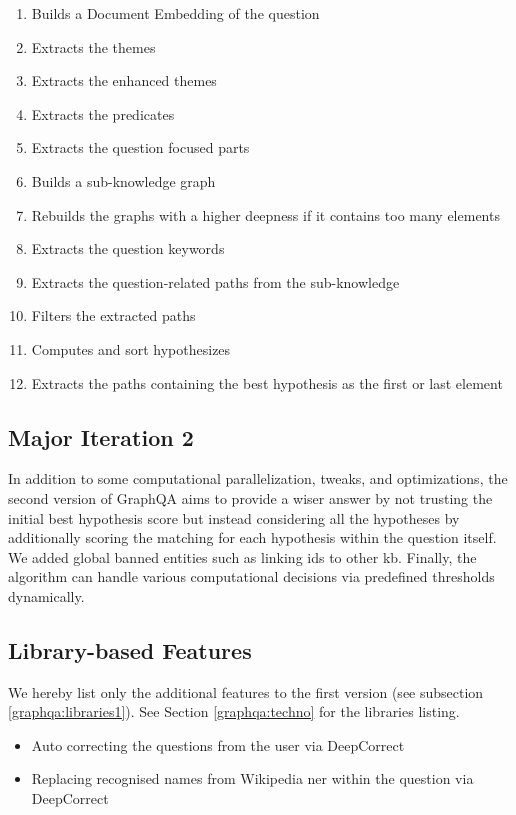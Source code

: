 \begin{enumerate}
    \setlength\itemsep{0em}
    \item Builds a Document Embedding of the question
    \item Extracts the themes
    \item Extracts the enhanced themes
    \item Extracts the predicates
    \item Extracts the question focused parts
    \item Builds a sub-knowledge graph
    \item Rebuilds the graphs with a higher deepness if it contains too many elements
    \item Extracts the question keywords
    \item Extracts the question-related paths from the sub-knowledge
    \item Filters the extracted paths
    \item Computes and sort hypothesizes
    \item Extracts the paths containing the best hypothesis as the first or last element
\end{enumerate}

\subsection{Major Iteration 2}
\label{graphqa:graphqa2}
In addition to some computational parallelization, tweaks, and optimizations, the second version of GraphQA aims to provide a wiser answer by not trusting the initial best hypothesis score but instead considering all the hypotheses by additionally scoring the matching for each hypothesis within the question itself. We added global banned entities such as linking ids to other \gls{kb}. Finally, the algorithm can handle various computational decisions via predefined thresholds dynamically.

\subsection{Library-based Features}
\label{graphqa:libraries2}
We hereby list only the additional features to the first version (see subsection \ref{graphqa:libraries1}). See Section \ref{graphqa:techno} for the libraries listing.

\begin{itemize}
    \setlength\itemsep{0em}
    \item Auto correcting the questions from the user via DeepCorrect
    \item Replacing recognised names from Wikipedia \gls{ner} within the question via DeepCorrect
\end{itemize}

